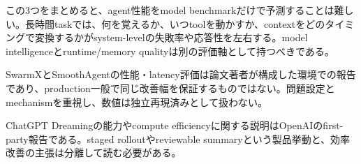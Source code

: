 この3つをまとめると、agent性能をmodel benchmarkだけで予測することは難しい。長時間taskでは、何を覚えるか、いつtoolを動かすか、contextをどのタイミングで変換するかがsystem-levelの失敗率や応答性を左右する。model intelligenceとruntime/memory qualityは別の評価軸として持つべきである。\autocite{src-80f8b4d899ff,src-c3ab33c62226,src-e8d9fd84bddc}


\begin{claimboundary}
SwarmXとSmoothAgentの性能・latency評価は論文著者が構成した環境での報告であり、production一般で同じ改善幅を保証するものではない。問題設定とmechanismを重視し、数値は独立再現済みとして扱わない。\autocite{src-80f8b4d899ff,src-e8d9fd84bddc}
\end{claimboundary}

\begin{claimboundary}
ChatGPT Dreamingの能力やcompute efficiencyに関する説明はOpenAIのfirst-party報告である。staged rolloutやreviewable summaryという製品挙動と、効率改善の主張は分離して読む必要がある。\autocite{src-c3ab33c62226}
\end{claimboundary}
